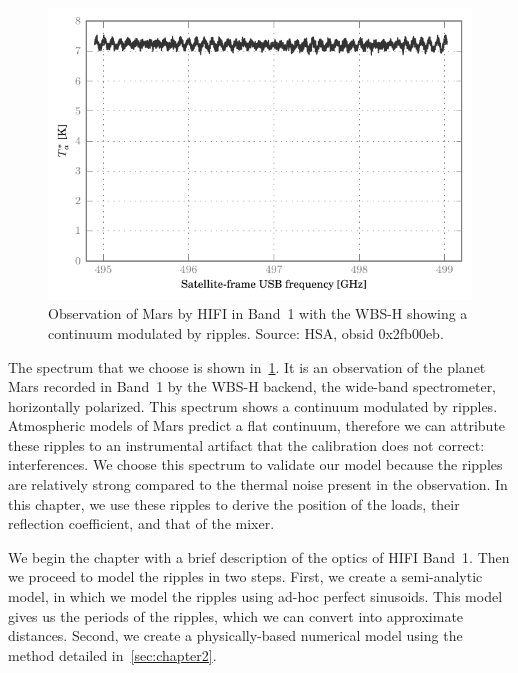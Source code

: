\begin{refsection}
\begin{figure}
    \centering
    \includegraphics{mars_25_original}
    \caption{Observation of Mars by HIFI in Band~1 with the WBS-H showing a continuum modulated by ripples.
    Source: HSA, obsid 0x2fb00eb.}
    \label{fig:mars_25_original}
\end{figure}

The spectrum that we choose is shown in~\cref{fig:mars_25_original}.
It is an observation of the planet Mars recorded in Band~1 by the WBS-H backend, the wide-band spectrometer, horizontally polarized.
This spectrum shows a continuum modulated by ripples.
Atmospheric models of Mars predict a flat continuum, therefore we can attribute these ripples to an instrumental artifact that the calibration does not correct: interferences.
We choose this spectrum to validate our model because the ripples are relatively strong compared to the thermal noise present in the observation.
In this chapter, we use these ripples to derive the position of the loads, their reflection coefficient, and that of the mixer.

We begin the chapter with a brief description of the optics of HIFI Band~1.
Then we proceed to model the ripples in two steps.
First, we create a semi-analytic model, in which we model the ripples using ad-hoc perfect sinusoids.
This model gives us the periods of the ripples, which we can convert into approximate distances.
Second, we create a physically-based numerical model using the method detailed in~\cref{sec:chapter2}.


\FloatBarrier




\end{refsection}
